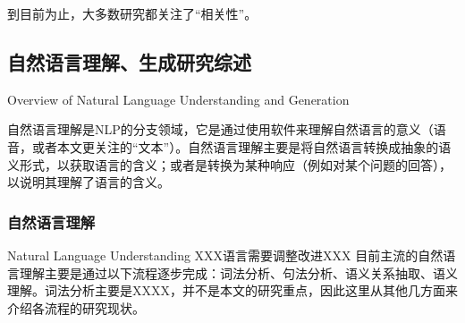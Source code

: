 到目前为止，大多数研究都关注了“相关性”。

\subsection{自然语言理解、生成研究综述}{Overview of Natural Language Understanding and Generation}

自然语言理解是NLP的分支领域，它是通过使用软件来理解自然语言的意义（语音，或者本文更关注的“文本”）。自然语言理解主要是将自然语言转换成抽象的语义形式，以获取语言的含义；或者是转换为某种响应（例如对某个问题的回答），以说明其理解了语言的含义。

\subsubsection{自然语言理解}{Natural Language Understanding}
XXX语言需要调整改进XXX
目前主流的自然语言理解主要是通过以下流程逐步完成：词法分析、句法分析、语义关系抽取、语义理解。词法分析主要是XXXX，并不是本文的研究重点，因此这里从其他几方面来介绍各流程的研究现状。


